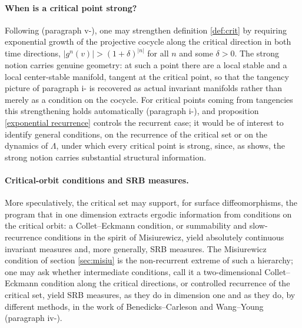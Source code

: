 \documentclass[a4paper,11pt]{article}
\theoremstyle{definition}
\def\La{\Lambda}
\def\de{\delta}
\def\La{\Lambda}
\begin{document}
\paragraph{When is a critical point strong?} Following \cite{CLPY} (paragraph
v-), one may strengthen definition \ref{def:crit} by requiring exponential
growth of the projective cocycle along the critical direction in both time
directions, $|g^n(v)|>(1+\de)^{|n|}$ for all $n$ and some $\de>0$. The
strong notion carries genuine geometry: at such a point there are a local
stable and a local center-stable manifold, tangent at the critical point, so
that the tangency picture of paragraph i- is recovered as actual invariant
manifolds rather than merely as a condition on the cocycle. For critical
points coming from tangencies this strengthening holds automatically
(paragraph i-), and proposition \ref{exponential recurrence} controls the
recurrent case; it would be of interest to identify general conditions,
on the recurrence of the critical set or on the dynamics of $\La$, under
which every critical point is strong, since, as \cite{CLPY} shows, the strong
notion carries substantial structural information.

\paragraph{Critical-orbit conditions and SRB measures.} More speculatively, the
critical set may support, for surface diffeomorphisms, the program that in
one dimension extracts ergodic information from conditions on the critical
orbit: a Collet--Eckmann condition, or summability and slow-recurrence
conditions in the spirit of Misiurewicz, yield absolutely continuous
invariant measures and, more generally, SRB measures. The Misiurewicz
condition of section \ref{sec:misiu} is the non-recurrent extreme of such a
hierarchy; one may ask whether intermediate conditions, call it a two-dimensional
Collet--Eckmann condition along the critical directions, or controlled
recurrence of the critical set, yield SRB measures, as they do in
dimension one and as they do, by different methods, in the work of
Benedicks--Carleson and Wang--Young (paragraph iv-).
\end{document}
